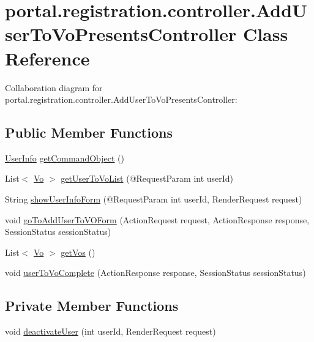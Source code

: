 \hypertarget{classportal_1_1registration_1_1controller_1_1AddUserToVoPresentsController}{
\section{portal.registration.controller.AddUserToVoPresentsController Class Reference}
\label{classportal_1_1registration_1_1controller_1_1AddUserToVoPresentsController}
}


Collaboration diagram for portal.registration.controller.AddUserToVoPresentsController:
\subsection*{Public Member Functions}
\begin{DoxyCompactItemize}
\item 
\hyperlink{classportal_1_1registration_1_1domain_1_1UserInfo}{UserInfo} \hyperlink{classportal_1_1registration_1_1controller_1_1AddUserToVoPresentsController_a224fcac7ef46714053cdba79aa033173}{getCommandObject} ()
\item 
List$<$ \hyperlink{classportal_1_1registration_1_1domain_1_1Vo}{Vo} $>$ \hyperlink{classportal_1_1registration_1_1controller_1_1AddUserToVoPresentsController_a66e34d894781132d66af5df698ceca93}{getUserToVoList} (@RequestParam int userId)
\item 
String \hyperlink{classportal_1_1registration_1_1controller_1_1AddUserToVoPresentsController_a648d1bc4409c6d066c845d26eeef8549}{showUserInfoForm} (@RequestParam int userId, RenderRequest request)
\item 
void \hyperlink{classportal_1_1registration_1_1controller_1_1AddUserToVoPresentsController_a00a3af630843a4726243dcdb2b2888b4}{goToAddUserToVOForm} (ActionRequest request, ActionResponse response, SessionStatus sessionStatus)
\item 
List$<$ \hyperlink{classportal_1_1registration_1_1domain_1_1Vo}{Vo} $>$ \hyperlink{classportal_1_1registration_1_1controller_1_1AddUserToVoPresentsController_a70638160f2dd0c8c0074f314057aa352}{getVos} ()
\item 
void \hyperlink{classportal_1_1registration_1_1controller_1_1AddUserToVoPresentsController_a71ec5744b44d623bc176c07bb0a6eb5f}{userToVoComplete} (ActionResponse response, SessionStatus sessionStatus)
\end{DoxyCompactItemize}
\subsection*{Private Member Functions}
\begin{DoxyCompactItemize}
\item 
void \hyperlink{classportal_1_1registration_1_1controller_1_1AddUserToVoPresentsController_aa50525ef91683e6c99413cca24b54ddd}{deactivateUser} (int userId, RenderRequest request)
\end{DoxyCompactItemize}
